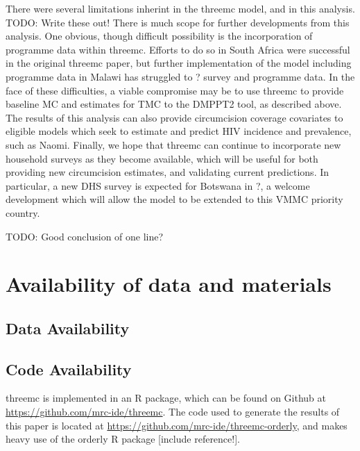 \documentclass[a4paper, 12pt]{article}
\begin{document}
There were several limitations inherint in the threemc model, and in this analysis. 
TODO: Write these out!
There is much scope for further developments from this analysis. 
One obvious, though difficult possibility is the incorporation of programme data within threemc. 
Efforts to do so in South Africa were successful in the original threemc paper, but further implementation of the model including programme data in Malawi has struggled to ? survey and programme data. 
In the face of these difficulties, a viable compromise may be to use threemc to provide baseline MC and estimates for TMC to the DMPPT2 tool, as described above. 
The results of this analysis can also provide circumcision coverage covariates to eligible models which seek to estimate and predict HIV incidence and prevalence, such as Naomi. 
Finally, we hope that threemc can continue to incorporate new household surveys as they become available, which will be useful for both providing new circumcision estimates, and validating current predictions. 
In particular, a new DHS survey is expected for Botswana in ?, a welcome development which will allow the model to be extended to this VMMC priority country. 

TODO: Good conclusion of one line?

\section{Availability of data and materials}
\label{sec:orgd999c87}
\subsection{Data Availability}
\label{sec:org953a659}
\subsection{Code Availability}
\label{sec:org2a96da6}
threemc is implemented in an R package, which can be found on Github at \url{https://github.com/mrc-ide/threemc}. The code used to generate the results of this paper is located at \url{https://github.com/mrc-ide/threemc-orderly}, and makes heavy use of the orderly R package [include reference!].
\end{document}
